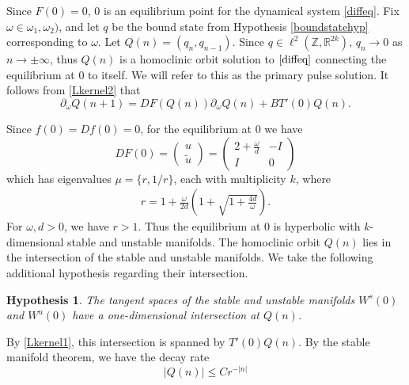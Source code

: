 \documentclass[12pt]{article}
\def\R{{\mathbb R}}
\def\Z{{\mathbb Z}}
\newtheorem{hypothesis}{Hypothesis}
\begin{document}
Since $F(0) = 0$, 0 is an equilibrium point for the dynamical system \eqref{diffeq}. Fix $\omega \in \omega_1, \omega_2)$, and let $q$ be the bound state from Hypothesis \ref{boundstatehyp} corresponding to $\omega$. Let $Q(n) = ( q_n, q_{n-1} )$. Since $q \in \ell^2(\Z, \R^{2k})$, $q_n \rightarrow 0$ as $n \rightarrow \pm \infty$, thus $Q(n)$ is a homoclinic orbit solution to $\eqref{diffeq}$ connecting the equilibrium at 0 to itself. We will refer to this as the primary pulse solution. It follows from \eqref{Lkernel2} that
\begin{equation}\label{DFkernel2}
\partial_\omega Q(n+1) = DF(Q(n)) \partial_\omega Q(n) + B T'(0)Q(n).
\end{equation}

Since $f(0) = Df(0) = 0$, for the equilibrium at 0 we have
\begin{equation}\label{DF0}
DF(0) = \begin{pmatrix}u \\ \tilde{u} \end{pmatrix} =
\begin{pmatrix}
2 + \frac{\omega}{d} & -I  \\
I & 0
\end{pmatrix} 
\end{equation}
which has eigenvalues $\mu = \{r, 1/r\}$, each with multiplicity $k$, where
\begin{align}\label{eigr}
r = 1 + \frac{\omega}{2 d} \left( 1 + \sqrt{1 + \frac{4 d}{\omega}} \right).
\end{align}
For $\omega, d > 0$, we have $r > 1$. Thus the equilibrium at 0 is hyperbolic with $k$-dimensional stable and unstable manifolds. The homoclinic orbit $Q(n)$ lies in the intersection of the stable and unstable manifolds. We take the following additional hypothesis regarding their intersection.

\begin{hypothesis}\label{intersectionhyp}
The tangent spaces of the stable and unstable manifolds $W^s(0)$ and $W^u(0)$ have a one-dimensional intersection at $Q(n)$.
\end{hypothesis}

\noindent By \eqref{Lkernel1}, this intersection is spanned by $T'(0)Q(n)$. By the stable manifold theorem, we have the decay rate
\begin{equation}\label{Qdecay}
|Q(n)| \leq C r^{-|n|}
\end{equation}
\end{document}
